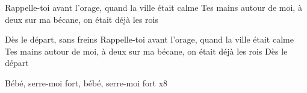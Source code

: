 \begin{guitar}
Rappelle-toi avant l'orage, quand la ville était calme
Tes mains autour de moi, à deux sur ma bécane, on était déjà les rois

Dès le départ, sans freins
Rappelle-toi avant l'orage, quand la ville était calme
Tes mains autour de moi, à deux sur ma bécane, on était déjà les rois
Dès le départ

Bébé, serre-moi fort, bébé, serre-moi fort x8
\end{guitar}